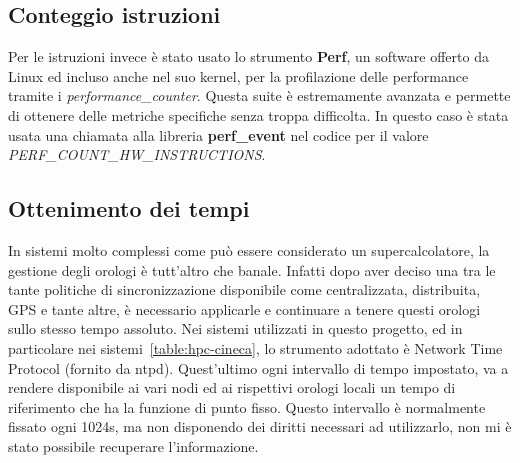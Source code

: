 \subsection{Conteggio istruzioni}
Per le istruzioni invece è stato usato lo strumento \textbf{Perf}, un software offerto da Linux ed incluso anche nel suo kernel, per la profilazione delle performance tramite i \emph{performance\_counter}. Questa suite è estremamente avanzata e permette di ottenere delle metriche specifiche senza troppa difficolta. In questo caso è stata usata una chiamata alla libreria \textbf{perf\_event} nel codice per il valore \emph{PERF\_COUNT\_HW\_INSTRUCTIONS}.

\subsection{Ottenimento dei tempi}
In sistemi molto complessi come può essere considerato un supercalcolatore, la gestione degli orologi è tutt'altro che banale. Infatti dopo aver deciso una tra le tante politiche di sincronizzazione disponibile come centralizzata, distribuita, GPS e tante altre, è necessario applicarle e continuare a tenere questi orologi sullo stesso tempo assoluto. Nei sistemi utilizzati in questo progetto, ed in particolare nei sistemi~\ref{table:hpc-cineca}, lo strumento adottato è Network Time Protocol (fornito da ntpd). Quest'ultimo ogni intervallo di tempo impostato, va a rendere disponibile ai vari nodi ed ai rispettivi orologi locali un tempo di riferimento che ha la funzione di punto fisso. Questo intervallo è normalmente fissato ogni 1024s, ma non disponendo dei diritti necessari ad utilizzarlo, non mi è stato possibile recuperare l'informazione.

